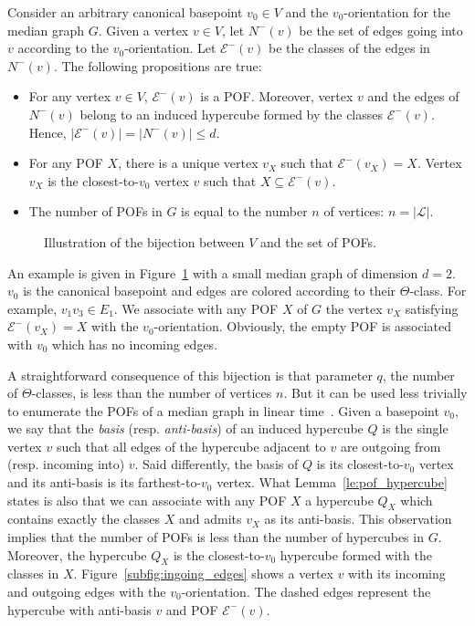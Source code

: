 \documentclass[a4paper,UKenglish,numberwithinsect,cleveref, autoref]{lipics-v2021}
\newcommand{\card}[1]{\left| #1 \right|}
\begin{document}
\begin{lemma}
Consider an arbitrary canonical basepoint $v_0 \in V$ and the $v_0$-orientation for the median graph $G$. Given a vertex $v \in V$, let $N^-(v)$ be the set of edges going into $v$ according to the $v_0$-orientation. Let $\mathcal{E}^-(v)$ be the classes of the edges in $N^-(v)$. The following propositions are true:
\begin{itemize}
\item For any vertex $v\in V$, $\mathcal{E}^-(v)$ is a POF. Moreover, vertex $v$ and the edges of $N^-(v)$ belong to an induced hypercube formed by the classes $\mathcal{E}^-(v)$. Hence, $\card{\mathcal{E}^-(v)} = \card{N^-(v)} \le d$.
\item For any POF $X$, there is a unique vertex $v_X$ such that $\mathcal{E}^-(v_X) = X$. Vertex $v_X$ is the closest-to-$v_0$ vertex $v$ such that $X \subseteq \mathcal{E}^-(v)$.
\item The number of POFs in $G$ is equal to the number $n$ of vertices: $n = \card{\mathcal{L}}$.
\end{itemize}
\label{le:pof_hypercube}
\end{lemma}

\begin{figure}[h]
\centering
\scalebox{0.95}{}
\caption{Illustration of the bijection between $V$ and the set of POFs.}
\label{fig:vertices_pof}
\end{figure}

An example is given in Figure~\ref{fig:vertices_pof} with a small median graph of dimension $d=2$. $v_0$ is the canonical basepoint  and edges are colored according to  their $\Theta$-class. For example, $v_1v_3 \in E_1$. We associate with any POF $X$ of $G$ the vertex $v_X$ satisfying $\mathcal{E}^-(v_X) = X$ with the $v_0$-orientation. Obviously, the empty POF is associated with $v_0$ which has no incoming edges.

A straightforward consequence of this bijection is that parameter $q$, the number of $\Theta$-classes, is less than the number of vertices $n$. But it can be used less trivially to enumerate the POFs of a median graph in linear time~\cite{BaQuSaMa02,Ko09}. Given a basepoint $v_0$, we say that the \textit{basis} (resp. \textit{anti-basis}) of an induced hypercube $Q$ is the single vertex $v$ such that all edges of the hypercube adjacent to $v$ are outgoing from (resp. incoming into) $v$. Said differently, the basis of $Q$ is its closest-to-$v_0$ vertex and its anti-basis is its farthest-to-$v_0$ vertex. What Lemma~\ref{le:pof_hypercube} states is also that we can associate with any POF $X$ a hypercube $Q_X$ which contains exactly the classes $X$ and admits $v_X$ as its anti-basis. This observation implies that the number of POFs is less than the number of hypercubes in $G$. Moreover, the hypercube $Q_X$ is the closest-to-$v_0$ hypercube formed with the classes in $X$. Figure~\ref{subfig:ingoing_edges} shows a vertex $v$ with its incoming and outgoing edges with the $v_0$-orientation. The dashed edges represent the hypercube with anti-basis $v$ and POF $\mathcal{E}^-(v)$.
\end{document}
